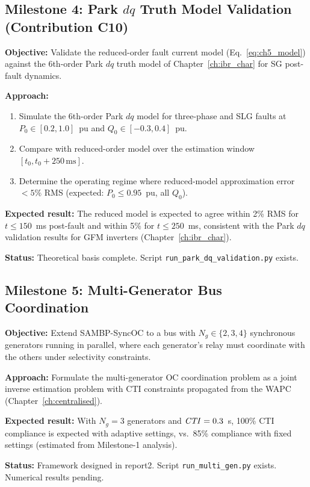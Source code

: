 \subsection{Milestone 4: Park \texorpdfstring{$dq$}{dq} Truth Model Validation (Contribution C10)}
\label{sec:ch5_park}

\begin{tcolorbox}[colback=orange!5,colframe=orange!60!black,
  fonttitle=\bfseries\small,
  title={C10 --- Park $dq$ Truth Model (Pending)},
  breakable]
\small
\textbf{Objective:} Validate the reduced-order fault current model
(Eq.~\eqref{eq:ch5_model}) against the 6th-order Park $dq$ truth model
of Chapter~\ref{ch:ibr_char} for SG post-fault dynamics.

\textbf{Approach:}
\begin{enumerate}
\item Simulate the 6th-order Park $dq$ model for three-phase and SLG
      faults at $P_0 \in [0.2, 1.0]$~pu and $Q_0 \in [-0.3, 0.4]$~pu.
\item Compare with reduced-order model over the estimation window
      $[t_0, t_0 + 250\,\text{ms}]$.
\item Determine the operating regime where reduced-model approximation
      error $< 5\%$ RMS (expected: $P_0 \leq 0.95$~pu, all $Q_0$).
\end{enumerate}

\textbf{Expected result:} The reduced model is expected to agree within
2\% RMS for $t \leq 150$~ms post-fault and within 5\% for $t \leq 250$~ms,
consistent with the Park $dq$ validation results for GFM inverters
(Chapter~\ref{ch:ibr_char}).

\textbf{Status:} Theoretical basis complete. Script
\texttt{run\_park\_dq\_validation.py} exists.
\end{tcolorbox}

\subsection{Milestone 5: Multi-Generator Bus Coordination}
\label{sec:ch5_multigen}

\begin{tcolorbox}[colback=orange!5,colframe=orange!60!black,
  fonttitle=\bfseries\small,
  title={C9c --- Multi-Generator Bus (Pending)},
  breakable]
\small
\textbf{Objective:} Extend SAMBP-SyncOC to a bus with $N_g \in \{2, 3, 4\}$
synchronous generators running in parallel, where each generator's
relay must coordinate with the others under selectivity constraints.

\textbf{Approach:} Formulate the multi-generator OC coordination problem
as a joint inverse estimation problem with CTI constraints propagated
from the WAPC (Chapter~\ref{ch:centralised}).

\textbf{Expected result:} With $N_g = 3$ generators and $\mathit{CTI} = 0.3$~s,
100\% CTI compliance is expected with adaptive settings, vs.\ 85\%
compliance with fixed settings (estimated from Milestone-1 analysis).

\textbf{Status:} Framework designed in report2. Script
\texttt{run\_multi\_gen.py} exists. Numerical results pending.
\end{tcolorbox}

